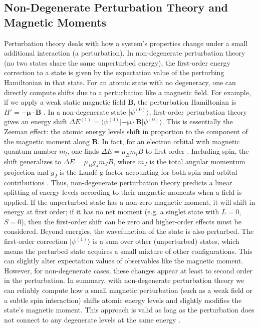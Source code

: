 \documentclass[12pt]{article}
\begin{document}
    \subsection{Non-Degenerate Perturbation Theory and Magnetic Moments}
        Perturbation theory deals with how a system’s properties change under a small additional interaction (a perturbation). In non-degenerate perturbation theory (no two states share the same unperturbed energy), the first-order energy correction to a state is given by the expectation value of the perturbing Hamiltonian in that state. For an atomic state with no degeneracy, one can directly compute shifts due to a perturbation like a magnetic field. For example, if we apply a weak static magnetic field $\mathbf{B}$, the perturbation Hamiltonian is $H' = -\boldsymbol{\mu}\cdot \mathbf{B}$ \cite{ZeemanW}. In a non-degenerate state $|\psi^{(0)}\rangle$, first-order perturbation theory gives an energy shift $\Delta E^{(1)} = \langle \psi^{(0)}| -\boldsymbol{\mu}\cdot \mathbf{B} |\psi^{(0)}\rangle$. This is essentially the Zeeman effect: the atomic energy levels shift in proportion to the component of the magnetic moment along $\mathbf{B}$. In fact, for an electron orbital with magnetic quantum number $m_l$, one finds $\Delta E = \mu_B m_l B$ to first order \cite{Zeeman}. Including spin, the shift generalizes to $\Delta E = \mu_B g_J m_J B$, where $m_J$ is the total angular momentum projection and $g_J$ is the Landé g-factor accounting for both spin and orbital contributions \cite{ZeemanW}. Thus, non-degenerate perturbation theory predicts a linear splitting of energy levels according to their magnetic moments when a field is applied. If the unperturbed state has a non-zero magnetic moment, it will shift in energy at first order; if it has no net moment (e.g. a singlet state with $L=0$, $S=0$), then the first-order shift can be zero and higher-order effects must be considered. Beyond energies, the wavefunction of the state is also perturbed. The first-order correction $|\psi^{(1)}\rangle$ is a sum over other (unperturbed) states, which means the perturbed state acquires a small mixture of other configurations. This can slightly alter expectation values of observables like the magnetic moment. However, for non-degenerate cases, these changes appear at least to second order in the perturbation. In summary, with non-degenerate perturbation theory we can reliably compute how a small magnetic perturbation (such as a weak field or a subtle spin interaction) shifts atomic energy levels and slightly modifies the state’s magnetic moment. This approach is valid as long as the perturbation does not connect to any degenerate levels at the same energy \cite{PerturbationTheory}.
        
\end{document}
